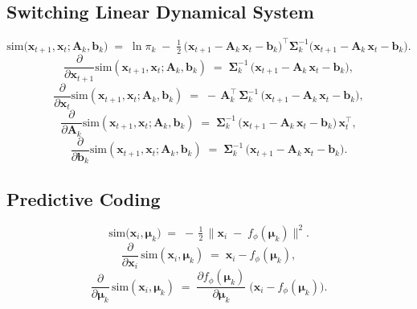 \documentclass{article}
\begin{document}
\subsection*{Switching Linear Dynamical System}
\[
\mathrm{sim}\bigl(\bm{x}_{t+1}, \bm{x}_t; \bm{A}_k, \bm{b}_k\bigr)
\;=\;
\ln \pi_k
\;-\;
\tfrac12\,\bigl(\bm{x}_{t+1} - \bm{A}_k\,\bm{x}_t - \bm{b}_k\bigr)^\top
\bm{\Sigma}_k^{-1}
\bigl(\bm{x}_{t+1} - \bm{A}_k\,\bm{x}_t - \bm{b}_k\bigr).
\]
\[
\frac{\partial}{\partial \bm{x}_{t+1}}\mathrm{sim}(\bm{x}_{t+1},\bm{x}_t;\bm{A}_k,\bm{b}_k)
\;=\;
\bm{\Sigma}_k^{-1}\,\bigl(\bm{x}_{t+1} - \bm{A}_k\,\bm{x}_t - \bm{b}_k\bigr),
\]
\[
\frac{\partial}{\partial \bm{x}_t}\mathrm{sim}(\bm{x}_{t+1},\bm{x}_t;\bm{A}_k,\bm{b}_k)
\;=\;
-\,\bm{A}_k^\top \,\bm{\Sigma}_k^{-1}\,\bigl(\bm{x}_{t+1} - \bm{A}_k\,\bm{x}_t - \bm{b}_k\bigr),
\]
\[
\frac{\partial}{\partial \bm{A}_k}\mathrm{sim}(\bm{x}_{t+1},\bm{x}_t;\bm{A}_k,\bm{b}_k)
\;=\;
\bm{\Sigma}_k^{-1}\,\bigl(\bm{x}_{t+1} - \bm{A}_k\,\bm{x}_t - \bm{b}_k\bigr)\,\bm{x}_t^\top,
\]
\[
\frac{\partial}{\partial \bm{b}_k}\mathrm{sim}(\bm{x}_{t+1},\bm{x}_t;\bm{A}_k,\bm{b}_k)
\;=\;
\bm{\Sigma}_k^{-1}\,\bigl(\bm{x}_{t+1} - \bm{A}_k\,\bm{x}_t - \bm{b}_k\bigr).
\]

\subsection*{Predictive Coding}
\[
\mathrm{sim}\bigl(\bm{x}_i,\bm{\mu}_k\bigr)
\;=\;
-\,\tfrac12\,
\bigl\|\bm{x}_i \;-\; f_\phi(\bm{\mu}_k)\bigr\|^2.
\]
\[
\frac{\partial}{\partial \bm{x}_i}\,\mathrm{sim}(\bm{x}_i,\bm{\mu}_k)
\;=\;
\bm{x}_i - f_\phi(\bm{\mu}_k),
\]
\[
\frac{\partial}{\partial \bm{\mu}_k}\,\mathrm{sim}(\bm{x}_i,\bm{\mu}_k)
\;=\;
\frac{\partial f_\phi(\bm{\mu}_k)}{\partial \bm{\mu}_k}
\;\bigl(\bm{x}_i - f_\phi(\bm{\mu}_k)\bigr).
\]
\end{document}
